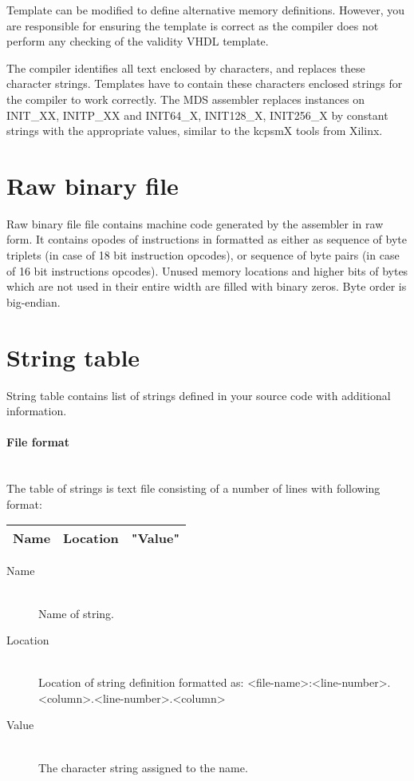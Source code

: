     Template can be modified to define alternative memory definitions. However, you are responsible for ensuring the template is correct as the compiler does not perform any checking of the validity VHDL template.

    The compiler identifies all text enclosed by {} characters, and replaces these character strings. Templates have to contain these {} characters enclosed strings for the compiler to work correctly. The MDS assembler replaces instances on {INIT\_XX}, {INITP\_XX} and {INIT64\_X}, {INIT128\_X}, {INIT256\_X} by constant strings with the appropriate values, similar to the kcpsmX tools from Xilinx.

\section{Raw binary file}
    Raw binary file file contains machine code generated by the assembler in raw form. It contains opodes of instructions in formatted as either as sequence of byte triplets (in case of 18 bit instruction opcodes), or sequence of byte pairs (in case of 16 bit instructions opcodes). Unused memory locations and higher bits of bytes which are not used in their entire width are filled with binary zeros. Byte order is big-endian.

\section{String table}
    String table contains list of strings defined in your source code with additional information.\\

    \paragraph{File format}
        ~\\
        The table of strings is text file consisting of a number of lines with following format:\\
        \begin{tabular}{|ccc|}
            \hline
            Name & Location & "Value" \\
            \hline
        \end{tabular}

    \begin{description}
        \item[Name]~\\
            Name of string.
        \item[Location]~\\
            Location of string definition formatted as: <file-name>:<line-number>.<column>.<line-number>.<column>
        \item[Value]~\\
            The character string assigned to the name.
    \end{description}

